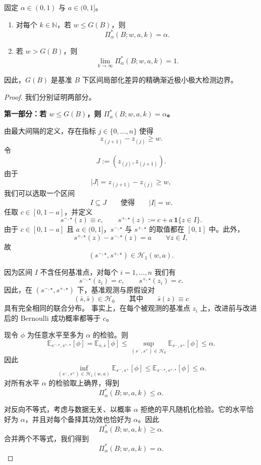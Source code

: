 \begin{theorem}[最大间隔作为精确的渐近极小极大检测边界]
固定 $\alpha\in(0,1)$ 与 $a\in(0,1]$。

\begin{enumerate}
\item 对每个 $k\in\mathbb N$，若 $w\le G(B)$，则
\[
\Pi_\alpha^*(B;w,a,k)=\alpha.
\]

\item 若 $w>G(B)$，则
\[
\lim_{k\to\infty}\Pi_\alpha^*(B;w,a,k)=1.
\]
\end{enumerate}

因此，$G(B)$ 是基准 $B$ 下区间局部化差异的精确渐近极小极大检测边界。
\end{theorem}

\begin{proof}
我们分别证明两部分。

\smallskip
\noindent\textbf{第一部分：若 $w\le G(B)$，则 $\Pi_\alpha^*(B;w,a,k)=\alpha$。}

由最大间隔的定义，存在指标 $j\in\{0,\dots,n\}$ 使得
\[
z_{(j+1)}-z_{(j)}\ge w.
\]
令
\[
J := (z_{(j)},z_{(j+1)}).
\]
由于
\[
|J| = z_{(j+1)} - z_{(j)} \ge w,
\]
我们可以选取一个区间
\[
I \subseteq J
\qquad\text{使得}\qquad
|I| = w .
\]
任取 \(c\in[0,1-a]\)，并定义
\[
s^{-,\star}(z)\equiv c,
\qquad
s^{+,\star}(z):=c+a\,\mathbf 1\{z\in I\}.
\]
由于 \(c\in[0,1-a]\) 且 \(a\in(0,1]\)，$s^{-,\star}$ 与 $s^{+,\star}$ 的取值都在 \([0,1]\) 中。此外，
\[
s^{+,\star}(z)-s^{-,\star}(z)=a
\qquad\forall z\in I,
\]
故
\[
(s^{-,\star},s^{+,\star})\in\mathcal H_1(w,a).
\]

因为区间 \(I\) 不含任何基准点，对每个 \(i=1,\dots,n\) 我们有
\[
s^{-,\star}(z_i)=c,
\qquad
s^{+,\star}(z_i)=c.
\]
因此，在 \((s^{-,\star},s^{+,\star})\) 下，基准观测与原假设对
\[
(\bar s,\bar s)\in\mathcal H_0
\qquad\text{其中}\qquad
\bar s(z)\equiv c
\]
具有完全相同的联合分布。
事实上，在每个被观测的基准点 \(z_i\) 上，改进前与改进后的 Bernoulli 成功概率都等于 \(c\)。

现令 $\phi$ 为任意水平至多为 $\alpha$ 的检验。则
\[
\mathbb E_{s^{-,\star},s^{+,\star}}[\phi]
=
\mathbb E_{\bar s,\bar s}[\phi]
\le
\sup_{(s^-,s^+)\in\mathcal H_0}\mathbb E_{s^-,s^+}[\phi]
\le \alpha.
\]
因此
\[
\inf_{(s^-,s^+)\in\mathcal H_1(w,a)}\mathbb E_{s^-,s^+}[\phi]
\le
\mathbb E_{s^{-,\star},s^{+,\star}}[\phi]
\le \alpha.
\]
对所有水平 $\alpha$ 的检验取上确界，得到
\[
\Pi_\alpha^*(B;w,a,k)\le \alpha.
\]

对反向不等式，考虑与数据无关、以概率 $\alpha$ 拒绝的平凡随机化检验。它的水平恰好为 $\alpha$，并且对每个备择其功效也恰好为 $\alpha$。因此
\[
\Pi_\alpha^*(B;w,a,k)\ge \alpha.
\]
合并两个不等式，我们得到
\[
\Pi_\alpha^*(B;w,a,k)=\alpha.
\]


\end{proof}
